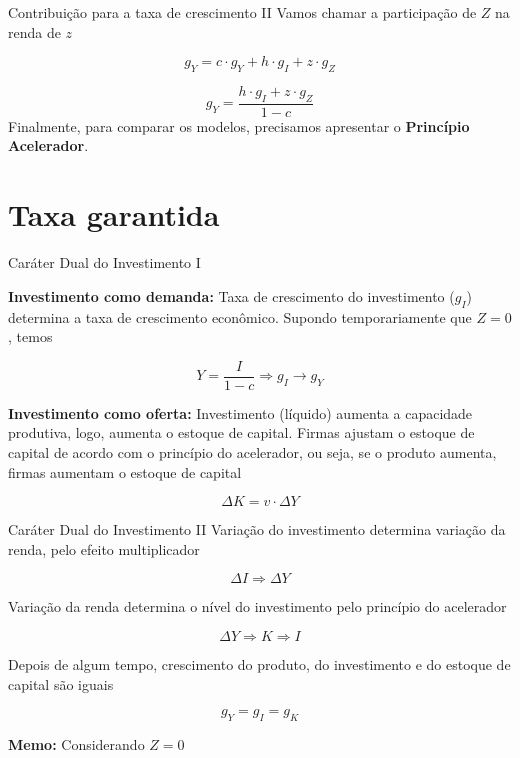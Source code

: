 \documentclass[10pt]{beamer}
\begin{document}
\begin{frame}{Contribuição para a taxa de crescimento II}
Vamos chamar a participação de $Z$ na renda de $z$

$$
g_Y = c\cdot g_Y + h\cdot g_I + z\cdot g_Z
$$

\begin{equation}
\label{Eq_Comp}
g_Y = \frac{h\cdot g_I + z\cdot g_Z}{1-c}
\end{equation}
Finalmente, para comparar os modelos, precisamos apresentar o \textbf{Princípio Acelerador}.
\end{frame}

%

\section{Taxa garantida}

\begin{frame}{Caráter Dual do Investimento I}

\textbf{Investimento como demanda:} Taxa de crescimento do investimento ($g_I$) determina a taxa de crescimento econômico. Supondo temporariamente que $Z=0$, temos
	
$$
Y = \frac{I}{1-c} \Rightarrow g_I \rightarrow g_Y
$$

\textbf{Investimento como oferta:} Investimento (líquido) aumenta a capacidade
produtiva, logo, aumenta o estoque de capital. Firmas ajustam o estoque de capital de acordo com o princípio do acelerador, ou seja, se o produto aumenta, firmas aumentam o
estoque de capital

$$
\Delta K = v\cdot \Delta Y
$$
\end{frame}

\begin{frame}{Caráter Dual do Investimento II}
Variação do investimento determina variação da renda, pelo efeito multiplicador

$$
\Delta I \Rightarrow \Delta Y
$$

Variação da renda determina o nível do investimento pelo princípio do acelerador

$$
\Delta Y \Rightarrow K \Rightarrow I
$$

Depois de algum tempo, crescimento do produto, do investimento e do estoque de capital são iguais

$$
g_Y = g_I = g_K
$$

\textbf{Memo:} Considerando $Z = 0$	
\end{frame}
\end{document}
